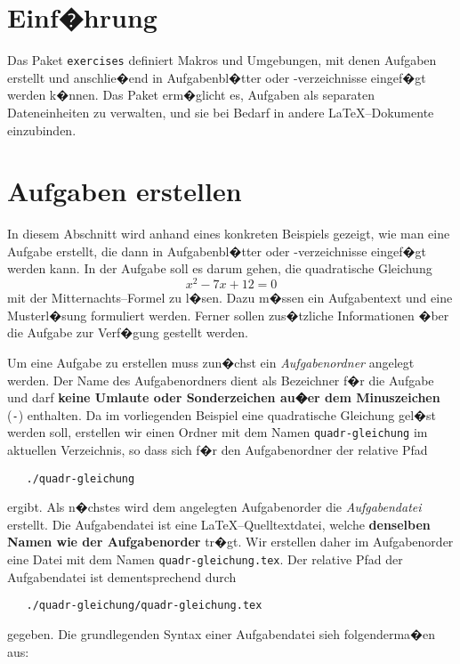\section{Einf�hrung}
Das Paket \verb|exercises| definiert Makros und Umgebungen, mit denen Aufgaben erstellt und anschlie�end in Aufgabenbl�tter oder -verzeichnisse eingef�gt werden k�nnen. Das Paket erm�glicht es, Aufgaben als separaten Dateneinheiten zu verwalten, und sie bei Bedarf in andere \LaTeX--Dokumente einzubinden.



\section{Aufgaben erstellen}

In diesem Abschnitt wird anhand eines konkreten Beispiels gezeigt, wie man eine Aufgabe erstellt, die dann in Aufgabenbl�tter oder -verzeichnisse eingef�gt werden kann. In der Aufgabe soll es darum gehen, die quadratische Gleichung
\[  x^2 - 7x + 12 = 0  \]
mit der Mitternachts--Formel zu l�sen. Dazu m�ssen ein Aufgabentext und eine Musterl�sung formuliert werden. Ferner sollen zus�tzliche Informationen �ber die Aufgabe zur Verf�gung gestellt werden.

Um eine Aufgabe zu erstellen muss zun�chst ein \emph{Aufgabenordner} angelegt werden. Der Name des Aufgabenordners dient als Bezeichner f�r die Aufgabe und darf \textbf{keine Umlaute oder Sonderzeichen au�er dem Minuszeichen} (\verb|-|) enthalten. Da im vorliegenden Beispiel eine quadratische Gleichung gel�st werden soll, erstellen wir einen Ordner mit dem Namen \verb|quadr-gleichung| im aktuellen Verzeichnis, so dass sich f�r den Aufgabenordner der relative Pfad
\begin{verbatim}
   ./quadr-gleichung
\end{verbatim}
ergibt. Als n�chstes wird dem angelegten Aufgabenorder die \emph{Aufgabendatei} erstellt. Die Aufgabendatei ist eine \LaTeX--Quelltextdatei, welche \textbf{denselben Namen wie der Aufgabenorder} tr�gt. Wir erstellen daher im Aufgabenorder eine Datei mit dem Namen \verb|quadr-gleichung.tex|. Der relative Pfad der Aufgabendatei ist dementsprechend durch
\begin{verbatim}
   ./quadr-gleichung/quadr-gleichung.tex
\end{verbatim}
gegeben. Die grundlegenden Syntax einer Aufgabendatei sieh folgenderma�en aus:

